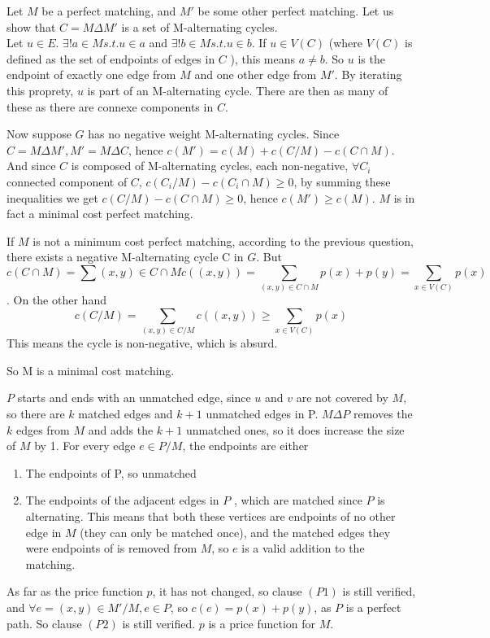 \documentclass{scrartcl}
\begin{document}
Let \( M \) be a perfect matching, and \( M' \) be some other perfect matching. Let us show that \( C = M \Delta M' \) is a set of M-alternating cycles. \\
Let \( u \in E \). \( \exists ! a \in M s.t. u \in a \) and \( \exists ! b \in M s.t. u \in b \). If \( u \in V(C) \) (where \( V(C)\) is defined as the set of endpoints of edges in \( C \) ), this means \( a \neq b \). So \( u \) is the endpoint of exactly one edge from \( M \) and one other edge from \( M' \). 
By iterating this proprety, \( u \) is part of an M-alternating cycle. 
There are then as many of these as there are connexe components in \( C \).

Now suppose \( G \) has no negative weight M-alternating cycles. Since \( C = M \Delta M', M' = M \Delta C \), hence \( c(M') = c(M) + c(C / M) - c(C \cap M) \). And since \( C \) is composed of M-alternating cycles, each non-negative, \( \forall C_i \) connected component of \( C \), \( c(C_i / M) - c(C_i \cap M) \geq 0\), by summing these inequalities we get \( c(C / M) - c(C \cap M) \geq 0 \), hence \( c(M') \geq c(M) \). \( M \) is in fact a minimal cost perfect matching.


If \( M \) is not a minimum cost perfect matching, according to the previous question, there exists a negative M-alternating cycle C in \( G \). But \[ c(C \cap M) = \sum{(x,y) \in C \cap M}c((x,y)) = \sum_{(x,y) \in C \cap M}p(x) + p(y) = \sum_{x \in V(C)} p(x) \].
On the other hand \[
c(C / M) = \sum_{(x,y) \in C / M}c((x,y)) \geq \sum_{x \in V(C)}p(x) \]
This means the cycle is non-negative, which is absurd.

So M is a minimal cost matching.


\( P \) starts and ends with an unmatched edge, since \( u \) and \( v \) are not covered by \( M \), so there are \( k \) matched edges and \( k + 1 \) unmatched edges in P. \( M \Delta P \) removes the \( k \) edges from \( M \) and adds the \( k + 1 \) unmatched ones, so it does increase the size of \( M \) by 1. For every edge \( e \in P / M \), the endpoints are either
\begin{enumerate}
\item The endpoints of P, so unmatched
\item The endpoints of the adjacent edges in \( P \) , which are matched since \( P \) is alternating. This means that both these vertices are endpoints of no other edge in \( M \) (they can only be matched once), and the matched edges they were endpoints of is removed from \( M \), so \( e \) is a valid addition to the matching.
\end{enumerate}
As far as the price function \( p \), it has not changed, so clause \( (P1) \) is still verified, and \( \forall e = (x,y) \in M' / M, e \in P\), so \( c(e) = p(x) + p(y) \), as \( P \) is a perfect path. So clause \( (P2) \) is still verified. \(p\) is a price function for \( M \).
\end{document}
